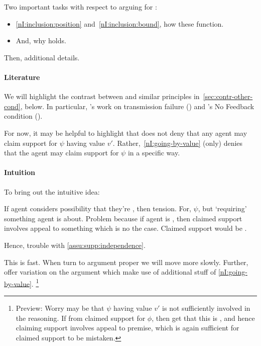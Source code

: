 \begin{note}[Task]
  Two important tasks with respect to arguing for \nI{}:

  \begin{itemize}
  \item \ref{nI:inclusion:position} and~\ref{nI:inclusion:bound}, how these function.
  \item And, why \nI{} holds.
  \end{itemize}

  Then, additional details.
\end{note}

\paragraph{Literature}

\begin{note}[Literature]
  We will highlight the contrast between \nI{} and similar principles in~\autoref{sec:contr-other-cond}, below.
  In particular, \citeauthor{Wright:2011wn}'s work on transmission failure (\Citeyear{Wright:2003aa,Wright:2011wn}) and \citeauthor{Weisberg:2010to}'s No Feedback condition (\Citeyear{Weisberg:2010to}).

  For now, it may be helpful to highlight that \nI{} does not deny that any agent may claim support for \(\psi\) having value \(v'\).
  Rather,~\ref{nI:going-by-value} (only) denies that the agent may claim support for \(\psi\) in a specific way.
\end{note}

\paragraph{Intuition}

\begin{note}
  To bring out the intuitive idea:

  If agent considers possibility that they're \mom{}, then tension.
  For, \(\psi\), but `requiring' something agent is \mom{} about.
  Problem because if agent is \mom{}, then claimed support involves appeal to something which is no the case.
  Claimed support would be \mom{}.

  Hence, trouble with \autoref{assu:supp:independence}.

  This is fast.
  When turn to argument proper we will move more slowly.
  Further, offer variation on the argument which make use of additional stuff of \ref{nI:going-by-value}.\nolinebreak
  \footnote{
    Preview:
    Worry may be that \(\psi\) having value \(v'\) is not sufficiently involved in the reasoning.
    If from claimed support for \(\phi\), then get that this is \mom{}, and hence claiming support involves appeal to \mom{} premise, which is again sufficient for claimed support to be mistaken.
  }
\end{note}

